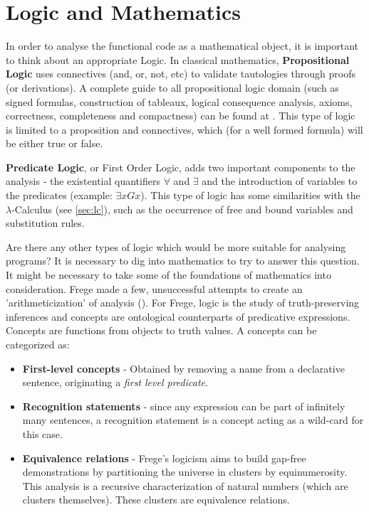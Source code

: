\chapter{Logic and Mathematics}
\label{sec:logic}

In order to analyse the functional code as a mathematical object, it is important to think about an appropriate Logic. In classical mathematics, \textbf{Propositional Logic} uses connectives (and, or, not, etc) to validate tautologies through proofs (or derivations). A complete guide to all propositional logic domain (such as signed formulas, construction of tableaux, logical consequence analysis, axioms, correctness, completeness and compactness) can be found at \cite{smullyan2014beginner}. This type of logic is limited to a proposition and connectives, which (for a well formed formula) will be either true or false.

\textbf{Predicate Logic}, or First Order Logic, adds two important components to the analysis - the existential quantifiers $ \forall $ and $ \exists $ and the introduction of variables to the predicates (example: $ \exists x Gx $). This type of logic has some similarities with the $\lambda $-Calculus (see \ref{sec:lc}), such as the occurrence of free and bound variables and substitution rules. 

Are there any other types of logic which would be more suitable for analysing programs? It is necessary to dig into mathematics to try to answer this question. It might be necessary to take some of the foundations of mathematics into consideration. Frege made a few, unsuccessful attempts to create an 'arithmeticization' of analysis (\cite{george2002philosophies}). For Frege, logic is the study of truth-preserving inferences and concepts are ontological counterparts of predicative expressions. Concepts are functions from objects to truth values. A concepts can be categorized as:

\begin{itemize}
  \item \textbf{First-level concepts} - Obtained by removing a name from a declarative sentence, originating a \textit{first level predicate}. 
  \item \textbf{Recognition statements} - since any expression can be part of infinitely many sentences, a recognition statement is a concept acting as a wild-card for this case. 
  \item \textbf{Equivalence relations} - Frege's logicism aims to build gap-free demonstrations by partitioning the universe in clusters by equinumerosity. This analysis is a recursive characterization of natural numbers (which are clusters themselves). These clusters are equivalence relations.
\end{itemize}

